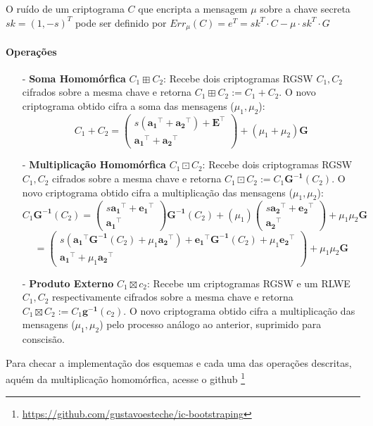O ruído de um criptograma $C$ que encripta a mensagem $\mu$ sobre a chave secreta $sk = (1, -s)^T$ pode ser
definido por $Err_\mu(C) = e^T = sk^T \cdot C - \mu \cdot sk^T \cdot G$ 

\paragraph{Operações}

\begin{itemize}
    \item[-] \textbf{Soma Homomórfica} $C_1 \boxplus C_2 $: Recebe dois criptogramas RGSW $C_1, C_2$ cifrados sobre a mesma chave e retorna $C_1 \boxplus C_2 := C_1 + C_2$. 
    O novo criptograma obtido cifra a soma das mensagens ($\mu_1, \mu_2$):
    $$
    C_1 + C_2 = \begin{pmatrix} s (\mathbf{a_1}^\top + \mathbf{a_2}^\top) + \mathbf{E}^\top \\ \mathbf{a_1}^\top + \mathbf{a_2}^\top \end{pmatrix} + (\mu_1 + \mu_2) \mathbf{G}
    $$
    \item[-] \textbf{Multiplicação Homomórfica} $C_1 \boxdot C_2$: Recebe dois criptogramas RGSW $C_1, C_2$ cifrados sobre a mesma chave e retorna $C_1 \boxdot C_2 := C_1 \mathbf{G^{-1}}(C_2)$. 
    O novo criptograma obtido cifra a multiplicação das mensagens ($\mu_1, \mu_2$): 
    $$
    C_1 \mathbf{G^{-1}}(C_2) = \begin{pmatrix} s \mathbf{a_1}^\top + \mathbf{e_1}^\top \\ \mathbf{a_1}^\top \end{pmatrix} \mathbf{G^{-1}}(C_2)  + (\mu_1) \begin{pmatrix} s \mathbf{a_2}^\top + \mathbf{e_2}^\top \\ \mathbf{a_2}^\top \end{pmatrix} + \mu_1 \mu_2 \mathbf{G}
    $$
    $$
        = \begin{pmatrix} s (\mathbf{a_1}^\top \mathbf{G^{-1}}(C_2) + \mu_1 \mathbf{a_2}^\top) + \mathbf{e_1}^\top \mathbf{G^{-1}}(C_2) + \mu_1 \mathbf{e_2}^\top \\ \mathbf{a_1}^\top + \mu_1 \mathbf{a_2}^\top \end{pmatrix}  + \mu_1 \mu_2 \mathbf{G}
    $$
    \item[-] \textbf{Produto Externo} $C_1 \boxtimes c_2 $: Recebe um criptogramas RGSW e um RLWE $C_1, C_2$ respectivamente cifrados sobre a mesma chave e retorna $C_1 \boxtimes C_2 := C_1 \mathbf{g^{-1}}(c_2)$. 
    O novo criptograma obtido cifra a multiplicação das mensagens ($\mu_1, \mu_2$) pelo processo análogo ao anterior, suprimido para conscisão.
\end{itemize}

Para checar a implementação dos esquemas e cada uma das operações descritas, aquém da multiplicação homomórfica, acesse o github \footnote{\url{https://github.com/gustavoesteche/ic-bootstraping}} 